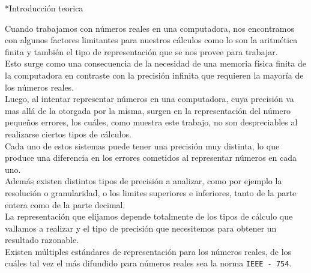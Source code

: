 \documentclass[12pt,titlepage]{article}
\newenvironment{usection}[1]{\newpage\begin{section}*{#1}	\addcontentsline{toc}{section}{#1}}{\end{section}}
\begin{document}



\begin{titlepage}
\maketitle
\end{titlepage}
\tableofcontents
\newpage

	\begin{usection}{Introducción teorica}

		Cuando trabajamos con números reales en una computadora,
		nos encontramos con algunos factores limitantes para nuestros cálculos
		como lo son la aritmética finita y
		también el tipo de representación que se nos provee para trabajar. 	\\
		Esto surge como una consecuencia de la necesidad
		de una memoria física finita de la computadora
		en contraste con la precisión infinita
		que requieren la mayoría de los números reales.
\\
		Luego, al intentar representar números en una computadora,
		cuya precisión va mas allá de la otorgada por la misma,
		surgen en la representación del número pequeños errores,
		los cuáles, como muestra este trabajo, no son despreciables
		al realizarse ciertos tipos de cálculos.
\\
		Cada uno de estos sistemas puede tener una precisión muy distinta,
		lo que produce una diferencia en los errores cometidos al representar
		números en cada uno.
\\
		Además existen distintos tipos de precisión a analizar, 
		como por ejemplo la resolución o granularidad,
		o los limites superiores e inferiores,
		tanto de la parte entera como de la parte decimal.
\\
		La representación que elijamos depende totalmente
		de los tipos de cálculo que vallamos a realizar
		y el tipo de precisión que necesitemos
		para obtener un resultado razonable.
\\
		Existen múltiples estándares de representación para los números reales,
		de los cuáles tal vez el más difundido para números reales
		sea la norma \texttt{IEEE - 754}.

	\end{usection}
	
\end{document}
